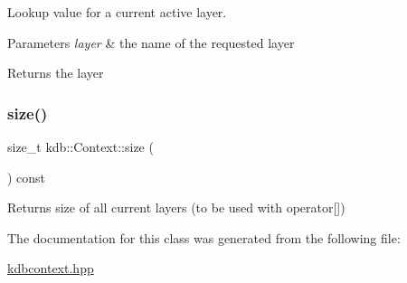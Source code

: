 Lookup value for a current active layer. 


\begin{DoxyParams}{Parameters}
{\em layer} & the name of the requested layer \\
\hline
\end{DoxyParams}
\begin{DoxyReturn}{Returns}
the layer 
\end{DoxyReturn}
\mbox{\label{classkdb_1_1Context_a2208d178203f74652a2a023b66d445fd}} 
\subsubsection{\texorpdfstring{size()}{size()}}
{\footnotesize\ttfamily size\+\_\+t kdb\+::\+Context\+::size (\begin{DoxyParamCaption}{ }\end{DoxyParamCaption}) const\hspace{0.3cm}{\ttfamily [inline]}}

\begin{DoxyReturn}{Returns}
size of all current layers (to be used with operator\mbox{[}\mbox{]}) 
\end{DoxyReturn}


The documentation for this class was generated from the following file\+:\begin{DoxyCompactItemize}
\item 
\hyperlink{kdbcontext_8hpp}{kdbcontext.\+hpp}\end{DoxyCompactItemize}
